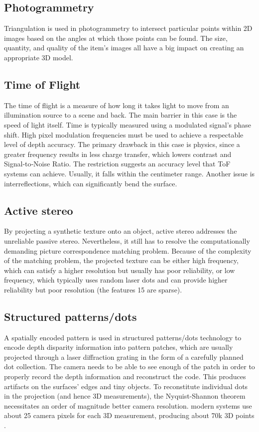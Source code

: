 \documentclass[12pt]{article}
\begin{document}
\subsection {Photogrammetry}
Triangulation is used in photogrammetry to intersect particular points within 2D images based on the angles at which those points can be found. The size, quantity, and quality of the item's images all have a big impact on creating an appropriate 3D model\cite{ref17}. 

\subsection{Time of Flight}
The time of flight is a measure of how long it takes light to move from an illumination source to a scene and back. The main barrier in this case is the speed of light itself.  Time is typically measured using a modulated signal's phase shift. High pixel modulation frequencies must be used to achieve a respectable level of depth accuracy. The primary drawback in this case is physics, since a greater frequency results in less charge transfer, which lowers contrast and Signal‑to‑Noise Ratio. The restriction suggests an accuracy level that ToF systems can achieve. Usually, it falls within the centimeter range. Another issue is interreflections, which can significantly bend the surface\cite{ref15}.

\subsection{Active stereo}
By projecting a synthetic texture onto an object, active stereo addresses the unreliable passive stereo. Nevertheless, it still has to resolve the computationally demanding picture correspondence matching problem. Because of the complexity of the matching problem, the projected texture can be either high frequency, which can satisfy a higher resolution but usually has poor reliability, or low frequency, which typically uses random laser dots and can provide higher reliability but poor resolution (the features 15 are sparse)\cite{ref15}.

\subsection{Structured patterns/dots}
A spatially encoded pattern is used in structured patterns/dots technology to encode depth disparity information into pattern patches, which are usually projected through a laser diffraction grating in the form of a carefully planned dot collection. The camera needs to be able to see enough of the patch in order to properly record the depth information and reconstruct the code. This produces artifacts on the surfaces' edges and tiny objects. To reconstitute individual dots in the projection (and hence 3D measurements), the Nyquist-Shannon theorem necessitates an order of magnitude better camera resolution. modern systems use about 25 camera pixels for each 3D measurement, producing about 70k 3D points \cite{ref15}. 
\end{document}
